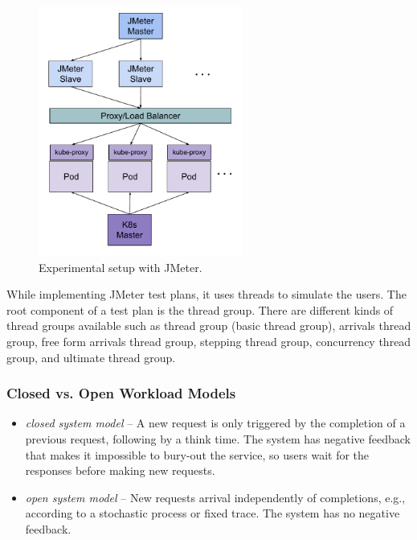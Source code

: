 \begin{figure}[htp]
    \centering
    \includegraphics[width=0.6\textwidth]{results/work_load/experimental_setup_v3.pdf}
    \caption{Experimental setup with JMeter.}
    \label{fi:experimental_setup}
\end{figure}

While implementing JMeter test plans, it uses threads to simulate the users. The root component of a test plan is the thread group. There are different kinds of thread groups available such as thread group (basic thread group), arrivals thread group, free form arrivals thread group, stepping thread group, concurrency thread group, and ultimate thread group.


\subsubsection{Closed vs. Open Workload Models}
\label{subse:closed_vs_open_workload}

\begin{itemize}
    \item \emph{closed system model} \cite{Haggett1998AnWales} -- A new request is only triggered by the completion of a previous request, following by a think time. The system has negative feedback that makes it impossible to bury-out the service, so users wait for the responses before making new requests.
    \item \emph{open system model} -- New requests arrival independently of completions, e.g., according to a stochastic process or fixed trace. The system has no negative feedback.
\end{itemize}

